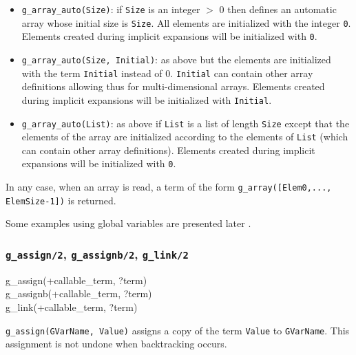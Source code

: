 \begin{itemize}

\item \texttt{g\_array\_auto(Size)}: if \texttt{Size} is an integer $>$ 0
then defines an automatic array whose initial size is \texttt{Size}. All
elements are initialized with the integer \texttt{0}. Elements
created during implicit expansions will be initialized with \texttt{0}.

\item \texttt{g\_array\_auto(Size, Initial)}: as above but the elements are
initialized with the term \texttt{Initial} instead of 0. \texttt{Initial} can
contain other array definitions allowing thus for multi-dimensional
arrays. Elements created during implicit expansions will be initialized with
\texttt{Initial}.

\item \texttt{g\_array\_auto(List)}: as above if \texttt{List} is a list of
length \texttt{Size} except that the elements of the array are initialized
according to the elements of \texttt{List} (which can contain other array
definitions). Elements created during implicit expansions will be initialized
with \texttt{0}.

\end{itemize}

In any case, when an array is read, a term of the form
\texttt{g\_array([Elem0,..., ElemSize-1])} is returned.

Some examples using global variables are presented later .

\subsubsection{\texttt{g\_assign/2},
               \texttt{g\_assignb/2},
               \texttt{g\_link/2}}
\label{g-assign/2}

\begin{TemplatesOneCol}
g\_assign(+callable\_term, ?term)\\
g\_assignb(+callable\_term, ?term)\\
g\_link(+callable\_term, ?term)

\end{TemplatesOneCol}

\Description

\texttt{g\_assign(GVarName, Value)} assigns a copy of the term
\texttt{Value} to \texttt{GVarName}. This assignment is not undone when
backtracking occurs.

